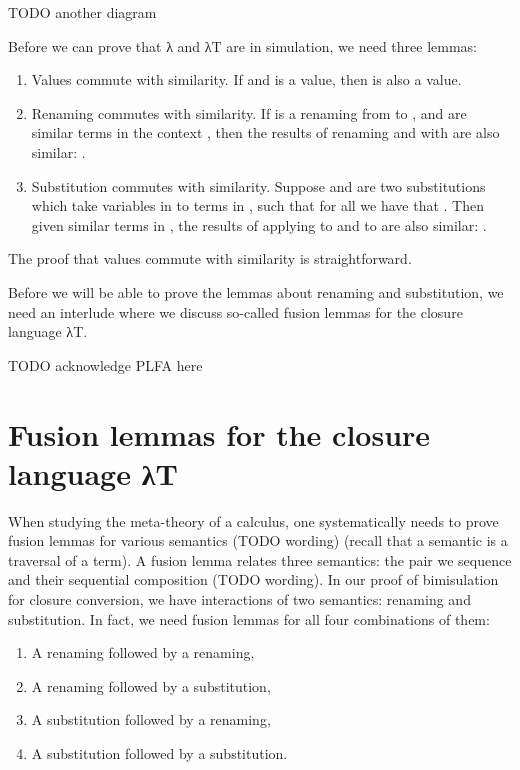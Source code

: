 \documentclass[bsc,frontabs,twoside,singlespacing,parskip,deptreport]{infthesis}
\theoremstyle{definition}
\begin{document}
TODO another diagram

Before we can prove that λ and λT are in simulation, we need three
lemmas:

\begin{enumerate}
\item
  Values commute with similarity. If  and  is a
  value, then  is also a value.

\item
  Renaming commutes with similarity. If  is a renaming from
   to , and  are similar terms in the context
  , then the results of renaming  and  with 
  are also similar: .

\item
  Substitution commutes with similarity. Suppose  and  are two
  substitutions which take variables  in  to terms in ,
  such that for all  we have that . Then given similar terms  in , the results
  of applying  to  and  to  are also
  similar: .
\end{enumerate}

The proof that values commute with similarity is straightforward.


Before we will be able to prove the lemmas about renaming and substitution, we need an interlude
where we discuss so-called fusion lemmas for the closure language λT.

TODO acknowledge PLFA here


\section{Fusion lemmas for the closure language λT}

When studying the meta-theory of a calculus, one systematically needs
to prove fusion lemmas for various semantics (TODO wording) (recall
that a semantic is a traversal of a term). A fusion
lemma relates three semantics: the pair we sequence and their
sequential composition (TODO wording). In our proof of bimisulation
for closure conversion, we have interactions of two semantics:
renaming and substitution. In fact, we need fusion lemmas for all four
combinations of them:

\begin{enumerate}
  \item A renaming followed by a renaming,
  \item A renaming followed by a substitution,
  \item A substitution followed by a renaming,
  \item A substitution followed by a substitution.
  \end{enumerate}
\end{document}
